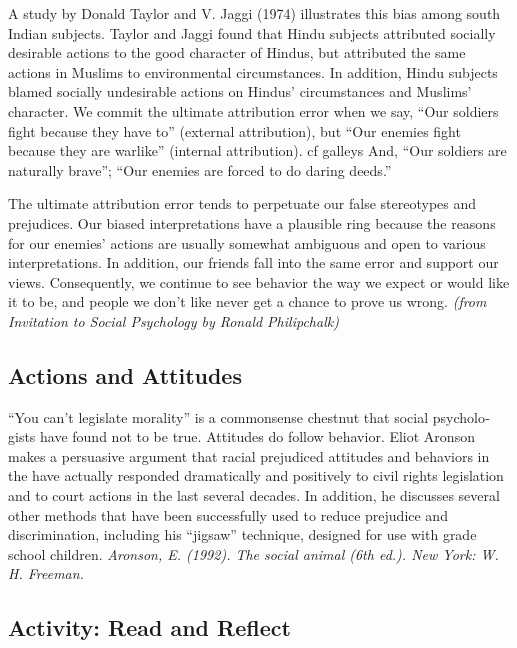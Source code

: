 \documentclass[
]{book}
\begin{document}
A study by Donald Taylor and V. Jaggi (1974) illustrates this bias among south Indian subjects. Taylor and Jaggi found that Hindu subjects attributed socially desirable actions to the good character of Hindus, but attributed the same actions in Muslims to environmental circumstances. In addition, Hindu subjects blamed socially undesirable actions on Hindus' circumstances and Muslims' character. We commit the ultimate attribution error when we say, ``Our soldiers fight because they have to'' (external attribution), but ``Our enemies fight because they are warlike'' (internal attribution). cf galleys And, ``Our soldiers are naturally brave''; ``Our enemies are forced to do daring deeds.''

The ultimate attribution error tends to perpetuate our false stereotypes and prejudices. Our biased interpretations have a plausible ring because the reasons for our enemies' actions are usually somewhat ambiguous and open to various interpretations. In addition, our friends fall into the same error and support our views. Consequently, we continue to see behavior the way we expect or would like it to be, and people we don't like never get a chance to prove us wrong. \emph{(from Invitation to Social Psychology by Ronald Philipchalk)}

\hypertarget{actions-and-attitudes}{%
\subsection*{Actions and Attitudes}\label{actions-and-attitudes}}

``You can't legislate morality'' is a commonsense chestnut that social psycholo­gists have found not to be true. Attitudes do follow behavior. Eliot Aronson makes a persuasive argument that racial prejudiced attitudes and behaviors in the have actually responded dramatically and positively to civil rights legisla­tion and to court actions in the last several decades. In addition, he discusses sev­eral other methods that have been successfully used to reduce prejudice and discrimination, including his ``jigsaw'' technique, designed for use with grade school children. \emph{Aronson, E. (1992). The social animal (6th ed.). New York: W. H. Freeman.}

\hypertarget{activity-read-and-reflect-5}{%
\subsection*{Activity: Read and Reflect}\label{activity-read-and-reflect-5}}
\end{document}
